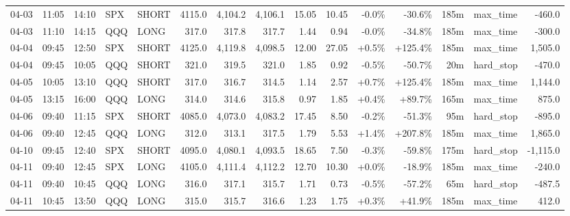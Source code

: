\documentclass[11pt,a4paper,twoside]{article}
\begin{document}
\begin{landscape}
\begin{center}
\begin{longtable}{>{\color{txtmain}}l l l l l r r r r r r r r >{\color{txtmain}}l r}
04-03 & 11:05 & 14:10 & SPX & SHORT & 4115.0 & 4,104.2 & 4,106.1 & 15.05 & 10.45 & \textcolor{lossred}{-0.0\%} & \textcolor{lossred}{-30.6\%} & 185m & max\_time & \textcolor{lossred}{-460.0} \\
04-03 & 11:10 & 14:15 & QQQ & LONG & 317.0 & 317.8 & 317.7 & 1.44 & 0.94 & \textcolor{lossred}{-0.0\%} & \textcolor{lossred}{-34.8\%} & 185m & max\_time & \textcolor{lossred}{-300.0} \\
04-04 & 09:45 & 12:50 & SPX & SHORT & 4125.0 & 4,119.8 & 4,098.5 & 12.00 & 27.05 & \textcolor{wingreen}{+0.5\%} & \textcolor{wingreen}{+125.4\%} & 185m & max\_time & \textcolor{wingreen}{1,505.0} \\
04-04 & 09:45 & 10:05 & QQQ & SHORT & 321.0 & 319.5 & 321.0 & 1.85 & 0.92 & \textcolor{lossred}{-0.5\%} & \textcolor{lossred}{-50.7\%} & 20m & hard\_stop & \textcolor{lossred}{-470.0} \\
04-05 & 10:05 & 13:10 & QQQ & SHORT & 317.0 & 316.7 & 314.5 & 1.14 & 2.57 & \textcolor{wingreen}{+0.7\%} & \textcolor{wingreen}{+125.4\%} & 185m & max\_time & \textcolor{wingreen}{1,144.0} \\
04-05 & 13:15 & 16:00 & QQQ & LONG & 314.0 & 314.6 & 315.8 & 0.97 & 1.85 & \textcolor{wingreen}{+0.4\%} & \textcolor{wingreen}{+89.7\%} & 165m & max\_time & \textcolor{wingreen}{875.0} \\
04-06 & 09:40 & 11:15 & SPX & SHORT & 4085.0 & 4,073.0 & 4,083.2 & 17.45 & 8.50 & \textcolor{lossred}{-0.2\%} & \textcolor{lossred}{-51.3\%} & 95m & hard\_stop & \textcolor{lossred}{-895.0} \\
04-06 & 09:40 & 12:45 & QQQ & LONG & 312.0 & 313.1 & 317.5 & 1.79 & 5.53 & \textcolor{wingreen}{+1.4\%} & \textcolor{wingreen}{+207.8\%} & 185m & max\_time & \textcolor{wingreen}{1,865.0} \\
04-10 & 09:45 & 12:40 & SPX & SHORT & 4095.0 & 4,080.1 & 4,093.5 & 18.65 & 7.50 & \textcolor{lossred}{-0.3\%} & \textcolor{lossred}{-59.8\%} & 175m & hard\_stop & \textcolor{lossred}{-1,115.0} \\
04-11 & 09:40 & 12:45 & SPX & LONG & 4105.0 & 4,111.4 & 4,112.2 & 12.70 & 10.30 & \textcolor{wingreen}{+0.0\%} & \textcolor{lossred}{-18.9\%} & 185m & max\_time & \textcolor{lossred}{-240.0} \\
04-11 & 09:40 & 10:45 & QQQ & LONG & 316.0 & 317.1 & 315.7 & 1.71 & 0.73 & \textcolor{lossred}{-0.5\%} & \textcolor{lossred}{-57.2\%} & 65m & hard\_stop & \textcolor{lossred}{-487.5} \\
04-11 & 10:45 & 13:50 & QQQ & LONG & 315.0 & 315.7 & 316.6 & 1.23 & 1.75 & \textcolor{wingreen}{+0.3\%} & \textcolor{wingreen}{+41.9\%} & 185m & max\_time & \textcolor{wingreen}{412.0} \\

\end{longtable}
\end{center}
\end{landscape}
\end{document}
